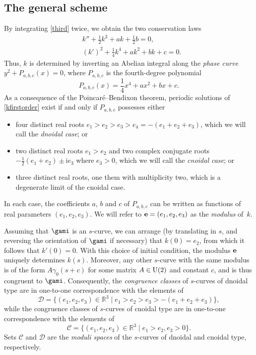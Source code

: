 \documentclass[10pt,a4paper]{amsart}
\newcommand\kk{k} %
\def\ri{\mathrm{i}}
\def\gam{\gamma} %
\def\R{\mathbb R}
\newcommand\be{{\bf e}}
\numberwithin{equation}{section}
\begin{document}
\subsection{The general scheme} By integrating \eqref{third} twice, we obtain the two conservation laws
\begin{subequations}\label{second}
\begin{align}
&\kk''+\frac{1}{2}\kk^3+a\kk+\frac12{b}=0, \label{ksecond}\\
&(\kk')^2+\frac{1}{4}\kk^4+a\kk^2+b\kk +c=0. \label{kfirstorder}
\end{align}
\end{subequations}
Thus, $\kk$ is determined by inverting an Abelian integral along the {\it phase curve} $y^2 + P_{a,b,c}(x)=0$, where $P_{a,b,c}$ is the fourth-degree polynomial
\begin{equation*}%
P_{a,b,c}(x)=\frac14 x^4+ax^2+bx+c.
\end{equation*}
As a consequence of the Poincar\'e--Bendixon theorem,
periodic solutions of \eqref{kfirstorder} exist if and only if $P_{a,b,c}$ possesses either
\begin{itemize}\itemsep=0pt
\item four distinct real roots $e_1>e_2>e_3>e_4=-(e_1+e_2+e_3)$, which we will call the {\it dnoidal case}; or
\item two distinct real roots $e_1>e_2$ and two complex conjugate roots $-\frac{1}{2}(e_1+e_2)\pm \ri e_3$ where $e_3>0$, which we will call the {\it cnoidal case}; or
\item three distinct real roots, one them with multiplicity two, which is a degenerate limit of the cnoidal case.
\end{itemize}
In each case, the coefficients $a$, $b$ and $c$ of $P_{a,b,c}$ can be written as functions of real parameters $(e_1, e_2, e_3)$. We will refer to $\be=(e_1, e_2, e_3)$ as the {\it modulus} of~$\kk$.

Assuming that $\gami$ is an $s$-curve, we can arrange (by translating in $s$, and reversing the orientation of $\gami$ if necessary)
that $\kk(0)=e_2$, from which it follows that $\kk'(0)=0$.
With this choice of initial condition, the modulus $\be$ uniquely determines $\kk(s)$.
Moreover, any other $s$-curve with the same modulus is of the form $A \gam_0(s+c)$ for some matrix $A\in {\rm U}(2)$ and constant $c$, and is thus {congruent} to $\gami$.
Consequently, the {\em congruence classes} of $s$-curves of dnoidal type are in one-to-one correspondence with the elements of
\[{\mathcal D}=\bigl\{(e_1,e_2,e_3)\in \R^3\mid e_1>e_2>e_3>-(e_1+e_2+e_3)\bigr\},\]
while the congruence classes of $s$-curves of cnoidal type are in one-to-one correspondence with the elements of{\samepage
\[{\mathcal C}=\bigl\{(e_1,e_2,e_3)\in \R^3\mid e_1>e_2, e_3>0\bigr\}.\]
Sets ${\mathcal C}$ and ${\mathcal D}$ are the {\it moduli spaces} of the $s$-curves of dnoidal and cnoidal type, respectively.}
\end{document}
